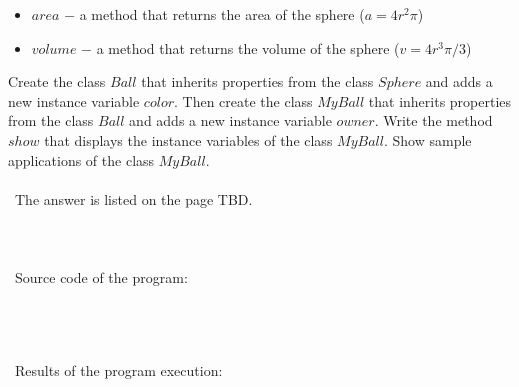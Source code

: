 \documentclass{article}
\begin{document}
	\begin{itemize}
		\item \(area\) \(-\) a method that returns the area of the sphere (\(a = 4r^2\pi\))
		\item \(volume\) \(-\) a method that returns the volume of the sphere (\(v = 4r^3\pi / 3\))
	\end{itemize}
	
	Create the class \(Ball\) that inherits properties from the class \(Sphere\) and adds a new instance variable \(color\). Then create the class \(MyBall\) that inherits properties from the class \(Ball\) and adds a new instance variable \(owner\). Write the method \(show\) that displays the instance variables of the class \(MyBall\). Show sample applications of the class \(MyBall\).

\paragraph{}\
	The answer is listed on the page TBD.
	
\paragraph{}\
\paragraph{}\
Source code of the program:

\begin{verbatim}
\end{verbatim}

\paragraph{}\
\paragraph{}\
	Results of the program execution:
	
\begin{verbatim} 
\end{verbatim}

\paragraph{}\
\paragraph{}\
\end{document}
